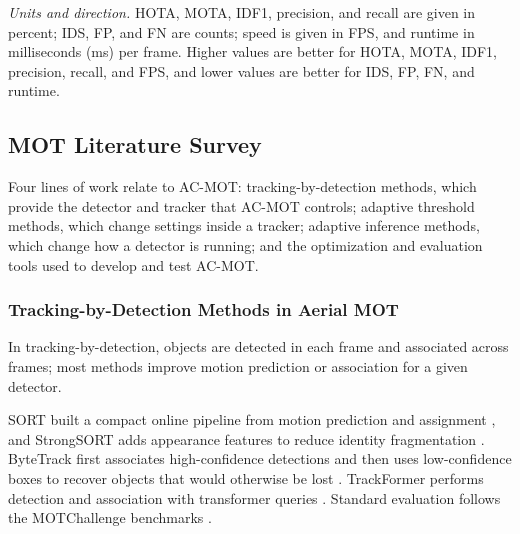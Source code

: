\documentclass[journal]{new-aiaa}
\begin{document}
\emph{Units and direction.} HOTA, MOTA, IDF1, precision, and recall are given
in percent; IDS, FP, and FN are counts; speed is given in FPS, and runtime in
milliseconds (ms) per frame. Higher values are better for HOTA, MOTA, IDF1,
precision, recall, and FPS, and lower values are better for IDS, FP, FN, and
runtime.

\subsection{MOT Literature Survey}
Four lines of work relate to AC-MOT: tracking-by-detection methods, which
provide the detector and tracker that AC-MOT controls; adaptive threshold
methods, which change settings inside a tracker; adaptive inference methods,
which change how a detector is running; and the optimization and evaluation
tools used to develop and test AC-MOT.

\subsubsection{Tracking-by-Detection Methods in Aerial MOT}\label{sec:hosts}
In tracking-by-detection, objects are detected in each frame and associated
across frames; most methods improve motion prediction or association for a
given detector.

SORT built a compact online pipeline from motion prediction and assignment
\cite{bewley2016sort}, and StrongSORT adds appearance features to reduce
identity fragmentation \cite{du2023strongsort}. ByteTrack first associates
high-confidence detections and then uses low-confidence boxes to recover
objects that would otherwise be lost \cite{zhang2022bytetrack}. TrackFormer
performs detection and association with transformer queries
\cite{meinhardt2022trackformer}. Standard evaluation follows the MOTChallenge
benchmarks \cite{dendorfer2021motchallenge}.
\end{document}
